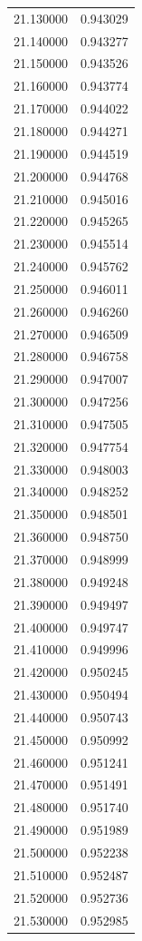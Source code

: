 \begin{tabular}{rr}
21.130000 & 0.943029 \\
21.140000 & 0.943277 \\
21.150000 & 0.943526 \\
21.160000 & 0.943774 \\
21.170000 & 0.944022 \\
21.180000 & 0.944271 \\
21.190000 & 0.944519 \\
21.200000 & 0.944768 \\
21.210000 & 0.945016 \\
21.220000 & 0.945265 \\
21.230000 & 0.945514 \\
21.240000 & 0.945762 \\
21.250000 & 0.946011 \\
21.260000 & 0.946260 \\
21.270000 & 0.946509 \\
21.280000 & 0.946758 \\
21.290000 & 0.947007 \\
21.300000 & 0.947256 \\
21.310000 & 0.947505 \\
21.320000 & 0.947754 \\
21.330000 & 0.948003 \\
21.340000 & 0.948252 \\
21.350000 & 0.948501 \\
21.360000 & 0.948750 \\
21.370000 & 0.948999 \\
21.380000 & 0.949248 \\
21.390000 & 0.949497 \\
21.400000 & 0.949747 \\
21.410000 & 0.949996 \\
21.420000 & 0.950245 \\
21.430000 & 0.950494 \\
21.440000 & 0.950743 \\
21.450000 & 0.950992 \\
21.460000 & 0.951241 \\
21.470000 & 0.951491 \\
21.480000 & 0.951740 \\
21.490000 & 0.951989 \\
21.500000 & 0.952238 \\
21.510000 & 0.952487 \\
21.520000 & 0.952736 \\
21.530000 & 0.952985 \\

\end{tabular}
